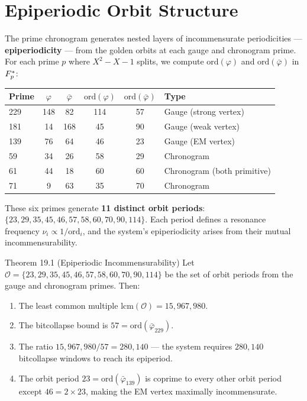 \section{Epiperiodic Orbit Structure}

The prime chronogram generates nested layers of incommensurate periodicities --- \textbf{epiperiodicity} --- from the golden orbits at each gauge and chronogram prime. For each prime $p$ where $X^2 - X - 1$ splits, we compute $\text{ord}(\varphi)$ and $\text{ord}(\bar\varphi)$ in $F_p^*$:

\begin{center}
\begin{tabular}{lccccl}
\toprule
\textbf{Prime} & $\varphi$ & $\bar\varphi$ & $\text{ord}(\varphi)$ & $\text{ord}(\bar\varphi)$ & \textbf{Type} \\
\midrule
229 & 148 & 82 & 114 & 57 & Gauge (strong vertex) \\
181 & 14 & 168 & 45 & 90 & Gauge (weak vertex) \\
139 & 76 & 64 & 46 & 23 & Gauge (EM vertex) \\
59 & 34 & 26 & 58 & 29 & Chronogram \\
61 & 44 & 18 & 60 & 60 & Chronogram (both primitive) \\
71 & 9 & 63 & 35 & 70 & Chronogram \\
\bottomrule
\end{tabular}
\end{center}

\noindent These six primes generate \textbf{11 distinct orbit periods}: $\{23, 29, 35, 45, 46, 57, 58, 60, 70, 90, 114\}$. Each period defines a resonance frequency $\nu_i \propto 1/\text{ord}_i$, and the system's epiperiodicity arises from their mutual incommensurability.

\begin{theorembox}{Theorem 19.1 (Epiperiodic Incommensurability)}
Let $\mathcal{O} = \{23, 29, 35, 45, 46, 57, 58, 60, 70, 90, 114\}$ be the set of orbit periods from the gauge and chronogram primes. Then:
\begin{enumerate}
    \item The least common multiple $\text{lcm}(\mathcal{O}) = 15{,}967{,}980$.
    \item The bitcollapse bound is $57 = \text{ord}(\bar\varphi_{229})$.
    \item The ratio $15{,}967{,}980 / 57 = 280{,}140$ --- the system requires $280{,}140$ bitcollapse windows to reach its epiperiod.
    \item The orbit period $23 = \text{ord}(\bar\varphi_{139})$ is coprime to every other orbit period except $46 = 2 \times 23$, making the EM vertex maximally incommensurate.
\end{enumerate}
\end{theorembox}

